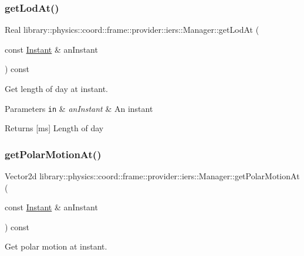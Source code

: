 \subsubsection{\texorpdfstring{get\+Lod\+At()}{getLodAt()}}
{\footnotesize\ttfamily Real library\+::physics\+::coord\+::frame\+::provider\+::iers\+::\+Manager\+::get\+Lod\+At (\begin{DoxyParamCaption}\item[{const \hyperlink{classlibrary_1_1physics_1_1time_1_1_instant}{Instant} \&}]{an\+Instant }\end{DoxyParamCaption}) const}



Get length of day at instant. 


\begin{DoxyParams}[1]{Parameters}
\mbox{\tt in}  & {\em an\+Instant} & An instant \\
\hline
\end{DoxyParams}
\begin{DoxyReturn}{Returns}
\mbox{[}ms\mbox{]} Length of day 
\end{DoxyReturn}
\mbox{\label{classlibrary_1_1physics_1_1coord_1_1frame_1_1provider_1_1iers_1_1_manager_a3023a701ae8b2abf5a93e9c0c46db37a}} 
\subsubsection{\texorpdfstring{get\+Polar\+Motion\+At()}{getPolarMotionAt()}}
{\footnotesize\ttfamily Vector2d library\+::physics\+::coord\+::frame\+::provider\+::iers\+::\+Manager\+::get\+Polar\+Motion\+At (\begin{DoxyParamCaption}\item[{const \hyperlink{classlibrary_1_1physics_1_1time_1_1_instant}{Instant} \&}]{an\+Instant }\end{DoxyParamCaption}) const}



Get polar motion at instant. 


